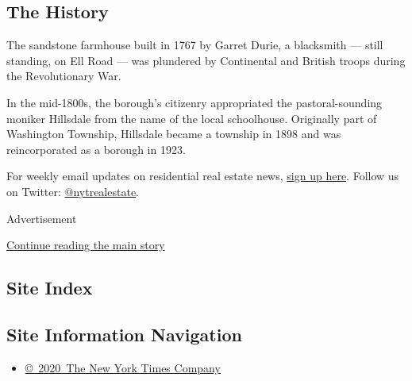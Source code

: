 \hypertarget{the-history}{%
\subsection{The History}\label{the-history}}

The sandstone farmhouse built in 1767 by Garret Durie, a blacksmith ---
still standing, on Ell Road --- was plundered by Continental and British
troops during the Revolutionary War.

In the mid-1800s, the borough's citizenry appropriated the
pastoral-sounding moniker Hillsdale from the name of the local
schoolhouse. Originally part of Washington Township, Hillsdale became a
township in 1898 and was reincorporated as a borough in 1923.

For weekly email updates on residential real estate news,
\href{http://www.nytimes3xbfgragh.onion/newsletters/realestate/}{sign up
here}. Follow us on Twitter:
\href{https://twitter.com/nytrealestate}{@nytrealestate}.

Advertisement

\protect\hyperlink{after-bottom}{Continue reading the main story}

\hypertarget{site-index}{%
\subsection{Site Index}\label{site-index}}

\hypertarget{site-information-navigation}{%
\subsection{Site Information
Navigation}\label{site-information-navigation}}

\begin{itemize}
\tightlist
\item
  \href{https://help.nytimes3xbfgragh.onion/hc/en-us/articles/115014792127-Copyright-notice}{©~2020~The
  New York Times Company}
\end{itemize}


